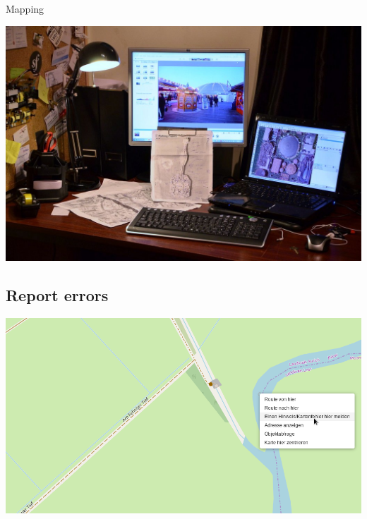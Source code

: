 \documentclass{beamer}
\begin{document}
	\begin{frame}{Mapping}
		\begin{center}
			\includegraphics[width=0.8\linewidth,height=0.8\textheight,keepaspectratio]{images/mapping_outdoor}
		\end{center}
	\end{frame}
	
	\subsection{Report errors}
	
	\begin{frame}
		\begin{center}
			\includegraphics[width=\linewidth,height=\textheight,keepaspectratio]{images/report-error-menu}
		\end{center}
	\end{frame}
	
\end{document}
